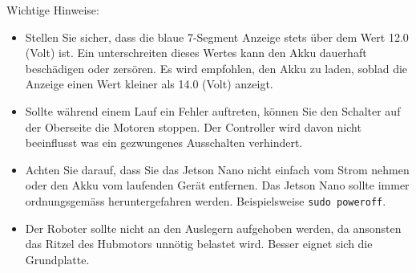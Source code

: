 Wichtige Hinweise:
\begin{itemize}
    \item Stellen Sie sicher, dass die blaue 7-Segment Anzeige stets über dem Wert 12.0 (Volt) ist. Ein unterschreiten dieses Wertes kann den Akku dauerhaft beschädigen oder zersören. Es wird empfohlen, den Akku zu laden, soblad die Anzeige einen Wert kleiner als 14.0 (Volt) anzeigt.
    \item Sollte während einem Lauf ein Fehler auftreten, können Sie den Schalter auf der Oberseite die Motoren stoppen. Der Controller wird davon nicht beeinflusst was ein gezwungenes Ausschalten verhindert.
    \item Achten Sie darauf, dass Sie das Jetson Nano nicht einfach vom Strom nehmen oder den Akku vom laufenden Gerät entfernen. Das Jetson Nano sollte immer ordnungsgemäss heruntergefahren werden. Beispielsweise \texttt{sudo poweroff}.
    \item Der Roboter sollte nicht an den Auslegern aufgehoben werden, da ansonsten das Ritzel des Hubmotors unnötig belastet wird. Besser eignet sich die Grundplatte.
\end{itemize}










